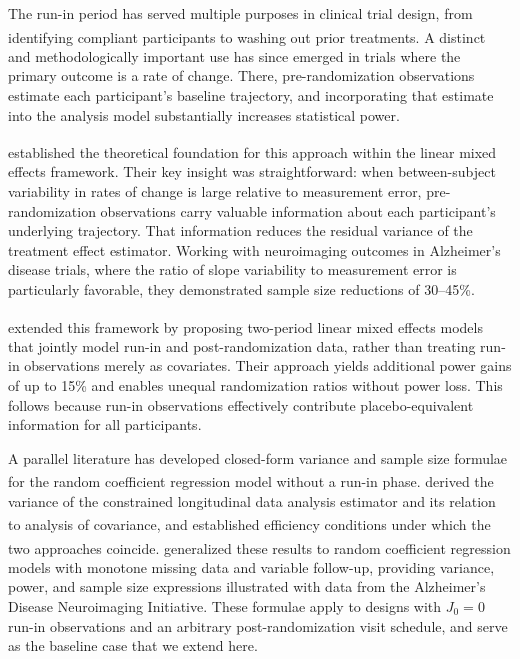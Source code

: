 \documentclass[
  11pt,
]{article}
\begin{document}
The run-in period has served multiple purposes in clinical trial
design, from identifying compliant participants to washing out
prior treatments\textsuperscript{}. A distinct and methodologically
important use has since emerged in trials where the primary
outcome is a rate of change. There, pre-randomization
observations estimate each participant's baseline trajectory,
and incorporating that estimate into the analysis model
substantially increases statistical power.

\textsuperscript{} established the theoretical
foundation for this approach within the linear mixed effects
framework. Their key insight was straightforward: when
between-subject variability in rates of change is large
relative to measurement error, pre-randomization observations
carry valuable information about each participant's underlying
trajectory. That information reduces the residual variance of
the treatment effect estimator. Working with neuroimaging
outcomes in Alzheimer's disease trials, where the ratio of
slope variability to measurement error is particularly
favorable, they demonstrated sample size reductions of
30--45\%.

\textsuperscript{} extended this framework by proposing
two-period linear mixed effects models that jointly model
run-in and post-randomization data, rather than treating run-in
observations merely as covariates. Their approach yields
additional power gains of up to 15\% and enables unequal
randomization ratios without power loss. This follows because
run-in observations effectively contribute placebo-equivalent
information for all participants.

A parallel literature has developed closed-form variance and
sample size formulae for the random coefficient regression
model without a run-in phase.\textsuperscript{} derived the variance of
the constrained longitudinal data analysis estimator and its
relation to analysis of covariance, and\textsuperscript{} established
efficiency conditions under which the two approaches coincide.\textsuperscript{} generalized these results to random coefficient
regression models with monotone missing data and variable
follow-up, providing variance, power, and sample size
expressions illustrated with data from the Alzheimer's Disease
Neuroimaging Initiative. These formulae apply to designs with
\(J_0 = 0\) run-in observations and an arbitrary post-randomization
visit schedule, and serve as the baseline case that we extend here.
\end{document}

